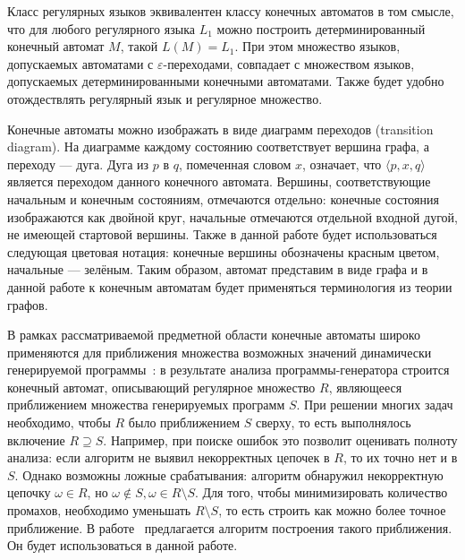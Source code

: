 Класс регулярных языков эквивалентен классу конечных автоматов в том смысле, что для любого регулярного языка $L_1$ можно построить детерминированный конечный автомат $M$, такой $ L(M)=L_1 $. При этом множество языков, допускаемых автоматами с $\varepsilon$-переходами, совпадает с множеством языков, допускаемых детерминированными конечными автоматами. Также будет удобно отождествлять регулярный язык и регулярное множество.

Конечные автоматы можно изображать в виде диаграмм переходов (transition diagram). На диаграмме каждому состоянию соответствует вершина графа, а переходу --- дуга. Дуга из $p$ в $q$, помеченная словом $x$, означает, что $\langle p , x , q \rangle$ является переходом данного конечного автомата. Вершины, соответствующие начальным и конечным состояниям, отмечаются отдельно: конечные состояния изображаются как двойной круг, начальные отмечаются отдельной входной дугой, не имеющей стартовой вершины. Также в данной работе будет использоваться следующая цветовая нотация: конечные вершины обозначены красным цветом, начальные --- зелёным.  Таким образом, автомат представим в виде графа и в данной работе к конечным автоматам будет применяться терминология из теории графов.

В рамках рассматриваемой предметной области конечные автоматы широко применяются для приближения множества возможных значений динамически генерируемой программы~\cite{Alvor1, JSA, RegOverApprox}: в результате анализа программы-генератора строится конечный автомат, описывающий регулярное множество $R$, являющееся приближением множества генерируемых программ $S$. При решении многих задач необходимо, чтобы $R$ было приближением $S$ сверху, то есть выполнялось включение $R \supseteq S$. Например, при поиске ошибок это позволит оценивать полноту анализа: если алгоритм не выявил некорректных цепочек в $R$, то их точно нет и в $S$. Однако возможны ложные срабатывания: алгоритм обнаружил некорректную цепочку $\omega \in R$, но $\omega \not\in S, \omega \in R \setminus S$. Для того, чтобы минимизировать количество промахов, необходимо уменьшать $R \setminus S$, то есть строить как можно более точное приближение. В работе~\cite{RegOverApprox} предлагается алгоритм построения такого приближения. Он будет использоваться в данной работе.


